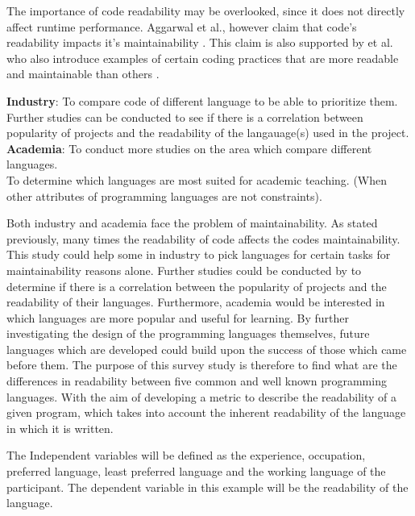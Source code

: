 \documentclass[times, 10pt,twocolumn]{IEEEtran}
\begin{document}
The importance of code readability may be overlooked, since it does not directly affect runtime performance. Aggarwal et al., however claim that code's readability impacts it's maintainability \cite{aggarwal2002integrated}. This claim is also supported by \cite{elshoff1982improving} et al. who also introduce examples of certain coding practices that are more readable and maintainable than others \cite{elshoff1982improving}.
\newline

\textbf{Industry}: To compare code of different language to be able to prioritize them. \\
Further studies can be conducted to see if there is a correlation between popularity of projects and the readability of the langauage(s) used in the project. \\
\textbf{Academia}: To conduct more studies on the area which compare different languages. \\
To determine which languages are most suited for academic teaching. (When other attributes of programming languages are not constraints).




Both industry and academia face the problem of maintainability. As stated previously, many times the readability of code affects the codes maintainability. This study could help some in industry to pick languages for certain tasks for maintainability reasons alone. Further studies could be conducted by to determine if there is a correlation between the popularity of projects and the readability of their languages. Furthermore, academia would be interested in which languages are more popular and useful for learning. By further investigating the design of the programming languages themselves, future languages which are developed could build upon the success of those which came before them.
\newline
The purpose of this survey study is therefore to find what are the differences in readability between five common and well known programming languages. With the aim of developing a metric to describe the readability of a given program, which takes into account the inherent readability of the language in which it is written.
\newline

The Independent variables will be defined as the experience, occupation, preferred language, least preferred language and the working language of the participant. The dependent variable in this example will be the readability of the language.
\newline
\end{document}
